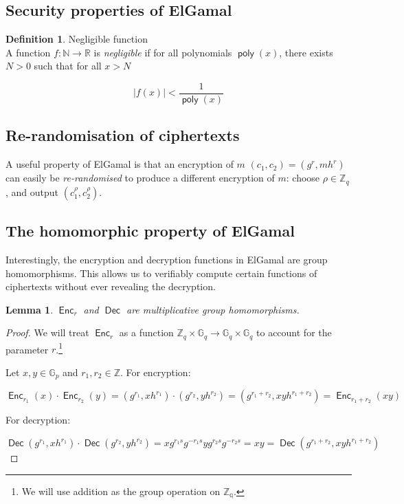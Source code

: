\documentclass[11pt,twoside,a4paper]{article}
\DeclareMathOperator{\poly}{\mathsf{poly}}
\DeclareMathOperator{\Enc}{\mathsf{Enc}}
\DeclareMathOperator{\Dec}{\mathsf{Dec}}
\newtheorem{lemma}[theorem]{Lemma}
\theoremstyle{definition}
\newtheorem{definition}{Definition}[section]
\begin{document}
\subsection{Security properties of ElGamal}
\begin{definition}{Negligible function}\\
    A function \(f:\mathbb{N}\rightarrow\mathbb{R}\) is \textit{negligible} if for all polynomials \(\poly(x)\), there exists \(N>0\) such that for all \(x>N\)

    \[|f(x)|<\frac{1}{\poly(x)}\]

\end{definition}
\subsection{Re-randomisation of ciphertexts}
A useful property of ElGamal is that an encryption of \(m\) \((c_1, c_2)=(g^r, mh^r)\) can easily be \textit{re-randomised} to produce a different encryption of \(m\): choose \(\rho\in\mathbb{Z}_q\), and output \((c_1^\rho, c_2^\rho)\).
\subsection{The homomorphic property of ElGamal}
Interestingly, the encryption and decryption functions in ElGamal are group homomorphisms. This allows us to verifiably compute certain functions of ciphertexts without ever revealing the decryption.
\begin{lemma}\label{lem-mul-homom}
    \(\Enc_r\) and \(\Dec\) are multiplicative group homomorphisms.
\end{lemma}
\begin{proof}
    We will treat \(\Enc_r\) as a function \(\mathbb{Z}_q\times\mathbb{G}_q\rightarrow\mathbb{G}_q\times\mathbb{G}_q\) to account for the parameter \(r\).\footnote{We will use addition as the group operation on \(\mathbb{Z_q}\).}

    Let \(x,y\in\mathbb{G}_p\) and \(r_1,r_2\in\mathbb{Z}\). For encryption:
    
    \[\Enc_{r_1}(x)\cdot\Enc_{r_2}(y)=(g^{r_1},xh^{r_1})\cdot(g^{r_2},yh^{r_2})=(g^{r_1+r_2},xyh^{r_1+r_2})=\Enc_{r_1+r_2}(xy)\]

    For decryption:

    \[\Dec(g^{r_1},xh^{r_1})\cdot\Dec(g^{r_2},yh^{r_2})=xg^{r_1s}g^{-r_1s}yg^{r_2s}g^{-r_2s}=xy=\Dec(g^{r_1+r_2},xyh^{r_1+r_2})\]
\end{proof}
\end{document}

